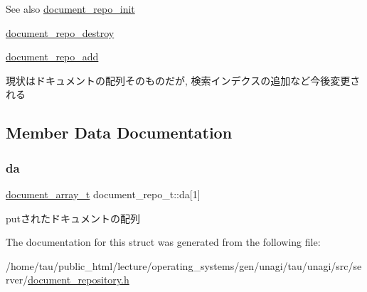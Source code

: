 \begin{DoxySeeAlso}{See also}
\hyperlink{document__repository_8h_ad73236d39e69cbae2e618682cb2faa4e}{document\+\_\+repo\+\_\+init} 

\hyperlink{document__repository_8h_a3e498b4e62c3223775c173a3b299f412}{document\+\_\+repo\+\_\+destroy} 

\hyperlink{document__repository_8h_aa6eebf0d0d4ec7f8d0a79dc7f061502b}{document\+\_\+repo\+\_\+add}
\end{DoxySeeAlso}
現状はドキュメントの配列そのものだが, 検索インデクスの追加など今後変更される 

\subsection{Member Data Documentation}
\mbox{\label{structdocument__repo__t_a9db2e8a3603bcf80f9500de054d5d995}} 
\subsubsection{\texorpdfstring{da}{da}}
{\footnotesize\ttfamily \hyperlink{structdocument__array__t}{document\+\_\+array\+\_\+t} document\+\_\+repo\+\_\+t\+::da\mbox{[}1\mbox{]}}

putされたドキュメントの配列 

The documentation for this struct was generated from the following file\+:\begin{DoxyCompactItemize}
\item 
/home/tau/public\+\_\+html/lecture/operating\+\_\+systems/gen/unagi/tau/unagi/src/server/\hyperlink{document__repository_8h}{document\+\_\+repository.\+h}\end{DoxyCompactItemize}
